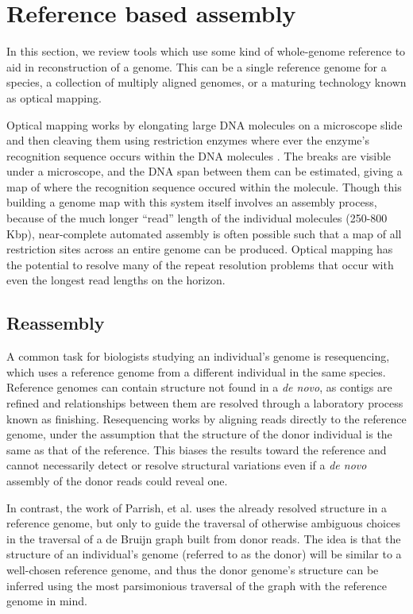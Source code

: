 \section{Reference based assembly}

In this section, we review tools which use some kind of whole-genome reference to aid in reconstruction of a genome.  This can be a single reference genome for a species, a collection of multiply aligned genomes, or a maturing technology known as optical mapping. 

Optical mapping works by elongating large DNA molecules on a microscope slide and then cleaving them using restriction enzymes where ever the enzyme's recognition sequence occurs within the DNA molecules \cite{ORMenc}.
The breaks are visible under a microscope, and the DNA span between them can be estimated, giving a map of where the recognition sequence occured within the molecule.
Though this building a genome map with this system itself involves an assembly process, because of the much longer ``read'' length of the individual molecules (250-800 Kbp), near-complete automated assembly is often possible such that a map of all restriction sites across an entire genome can be produced.  Optical mapping has the potential to resolve many of the repeat resolution problems that occur with even the longest read lengths on the horizon.

\subsection{Reassembly}

A common task for biologists studying an individual's genome is resequencing, which uses a reference genome from a different individual in the same species.
Reference genomes can contain structure not found in a \emph{de novo}, as contigs are refined and relationships between them are resolved through a laboratory process known as finishing.
Resequencing works by aligning reads directly to the reference genome, under the assumption that the structure of the donor individual is the same as that of the reference.
This biases the results toward the reference and cannot necessarily detect or resolve structural variations even if a \emph{de novo} assembly of the donor reads could reveal one.

In contrast, the work of Parrish, et al. \cite{parrish2013genome} uses the already resolved structure in a reference genome, but only to guide the traversal of otherwise ambiguous choices in the traversal of a de Bruijn graph built from donor reads.
The idea is that the structure of an individual's genome (referred to as the donor) will be similar to a well-chosen reference genome, and thus the donor genome's structure can be inferred using the most parsimonious traversal of the graph with the reference genome in mind.

